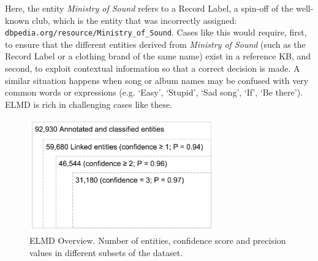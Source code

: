 Here, the entity \textit{Ministry of Sound} refers to a Record Label, a spin-off of the well-known club, which is the entity that was incorrectly assigned: {\footnotesize{\texttt{dbpedia.org/resource/Ministry\_of\_Sound}}}. 
Cases like this would require, first, to ensure that the different entities derived from \textit{Ministry of Sound} (such as the Record Label or a clothing brand of the same name) exist in a reference KB, and second, to exploit contextual information so that a correct decision is made.
A similar situation happens when song or album names may be confused with very common words or expressions (e.g. `Easy', `Stupid', `Sad song', `If', `Be there'). \textsc{ELMD} is rich in challenging cases like these.






\begin{figure}[h!]
  \centering
	\includegraphics[width=8cm]{ch03_linking_pics/ELMD_Overview_bn.pdf}
  \caption{ELMD Overview. Number of entities, confidence score and precision values in different subsets of the dataset.}
  \label{fig:linking:elmd}
\end{figure}

